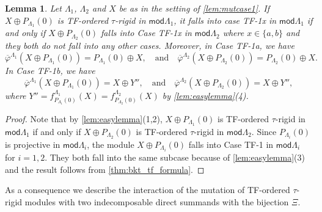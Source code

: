 \documentclass[11pt]{amsart}
\newcommand{\mods}{\mathsf{mod}}
\newtheorem{lemma}[theorem]{Lemma}
\theoremstyle{definition}
\begin{document}
\begin{lemma}\label{lem:mutcase2}
    Let $\Lambda_1$, $\Lambda_2$ and $X$ be as in the setting of \cref{lem:mutcase1}. If $X \oplus P_{\Lambda_1}(0)$ is TF-ordered $\tau$-rigid in $\mods \Lambda_1$, it falls into case TF-1x in $\mods \Lambda_1$ if and only if $X \oplus P_{\Lambda_2}(0)$ falls into Case TF-1x in $\mods \Lambda_2$ where $x \in \{a,b\}$ and they both do not fall into any other cases. Moreover, in Case TF-1a, we have
    \[ \overline{\varphi}^{\Lambda_1}(X \oplus P_{\Lambda_1}(0)) =  P_{\Lambda_1}(0) \oplus X, \quad \text{and} \quad \overline{\varphi}^{\Lambda_2}(X \oplus P_{\Lambda_2}(0)) =  P_{\Lambda_2}(0) \oplus X.\]
    In Case TF-1b, we have
    \[ \overline{\varphi}^{\Lambda_1}(X \oplus P_{\Lambda_1}(0)) =  X \oplus Y'', \quad \text{and} \quad \overline{\varphi}^{\Lambda_2}(X \oplus P_{\Lambda_2}(0)) =  X \oplus Y'',\]
    where $Y'' = f_{P_{\Lambda_1}(0)}^{\Lambda_1}(X) = f_{P_{\Lambda_2}(0)}^{\Lambda_2}(X)$ by \cref{lem:easylemma}(4).
\end{lemma}
\begin{proof}
   Note that by \cref{lem:easylemma}(1,2), $X \oplus P_{\Lambda_1}(0)$ is TF-ordered $\tau$-rigid in $\mods \Lambda_1$ if and only if $X \oplus P_{\Lambda_2}(0)$ is TF-ordered $\tau$-rigid in $\mods \Lambda_2$. Since $P_{\Lambda_i}(0)$ is projective in $\mods \Lambda_i$, the module $X \oplus P_{\Lambda_i}(0)$ falls into Case TF-1 in $\mods \Lambda_i$ for $i=1,2$. They both fall into the same subcase because of \cref{lem:easylemma}(3) and the result follows from \cref{thm:bkt_tf_formula}. 
\end{proof}

As a consequence we describe the interaction of the mutation of TF-ordered $\tau$-rigid modules with two indecomposable direct summands with the bijection $\Xi$.
\end{document}
